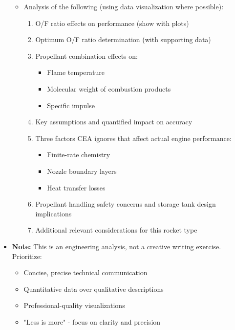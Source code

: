 \documentclass[12pt]{article}
\begin{document}
\begin{itemize}
\begin{itemize}
        \item Analysis of the following (using data visualization where possible):
        \begin{enumerate}
            \item O/F ratio effects on performance (show with plots)
            \item Optimum O/F ratio determination (with supporting data)
            \item Propellant combination effects on:
            \begin{itemize}
                \item Flame temperature
                \item Molecular weight of combustion products
                \item Specific impulse
            \end{itemize}
            \item Key assumptions and quantified impact on accuracy
            \item Three factors CEA ignores that affect actual engine performance:
            \begin{itemize}
                \item Finite-rate chemistry
                \item Nozzle boundary layers
                \item Heat transfer losses
            \end{itemize}
            \item Propellant handling safety concerns and storage tank design implications
            \item Additional relevant considerations for this rocket type
        \end{enumerate}
    \end{itemize}
    
    \item \textbf{Note:} This is an engineering analysis, not a creative writing exercise. Prioritize:
    \begin{itemize}
        \item Concise, precise technical communication
        \item Quantitative data over qualitative descriptions
        \item Professional-quality visualizations
        \item "Less is more" - focus on clarity and precision
    \end{itemize}
\end{itemize}
\end{document}
